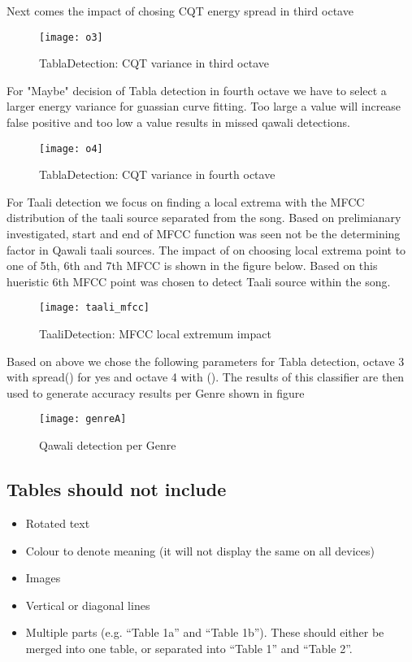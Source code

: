 \documentclass{article}
\begin{document}
Next comes the impact of chosing CQT energy spread in third octave
\begin{figure}[htbp]
  \centering
  \texttt{[image: o3]}
  \caption{TablaDetection: CQT variance in third octave}
\label{fig:src_o3}
\end{figure}


For "Maybe" decision of Tabla detection in fourth octave we have to select a larger energy variance for guassian curve fitting. Too large a value will increase false positive and too low a value results in missed qawali detections.
\begin{figure}[htbp]
  \centering
  \texttt{[image: o4]}
  \caption{TablaDetection: CQT variance in fourth octave}
\label{fig:src_o4}
\end{figure}

For Taali detection we focus on finding a local extrema with the MFCC distribution of the taali source separated from the song. Based on prelimianary investigated, start and end of MFCC function was seen not be the determining factor in Qawali taali sources. The impact of on choosing local extrema point to one of 5th, 6th and 7th MFCC is shown in the figure below. Based on this hueristic 6th MFCC point was chosen to detect Taali source within the song.
\begin{figure}[htbp]
  \centering
  \texttt{[image: taali\_mfcc]}
  \caption{TaaliDetection: MFCC local extremum impact}
\label{fig:src_mfcc}
\end{figure}

Based on above we chose the following parameters for Tabla detection, octave 3 with spread() for yes and octave 4 with (). The results of this classifier are then used to generate accuracy results per Genre shown in figure
\begin{figure}[htbp]
  \centering
  \texttt{[image: genreA]}
  \caption{Qawali detection per Genre}
\label{fig:src_genre}
\end{figure}

\subsection{Tables should not include}

\begin{itemize}
  \item Rotated text
  \item Colour to denote meaning (it will not display the same on all devices)
  \item Images
  \item Vertical or diagonal lines
  \item Multiple parts (e.g. ``Table 1a'' and ``Table 1b'').
  These should either be merged into one table,
  or separated into ``Table 1'' and ``Table 2''.
\end{itemize}
\end{document}
